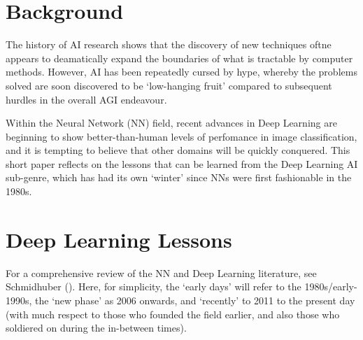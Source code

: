 \documentclass[citeauthoryear]{llncs}
\begin{document}
\section{Background}

The history of AI research shows that the discovery of new techniques 
oftne appears to deamatically expand the boundaries of what is 
tractable by computer methods.  
However, AI has been repeatedly cursed by hype, whereby the problems 
solved are soon discovered to be `low-hanging fruit' compared to subsequent 
hurdles in the overall AGI endeavour.

Within the Neural Network (NN) field, 
recent advances in Deep Learning are beginning to show better-than-human 
levels of perfomance in image classification, and 
it is tempting to believe that other domains will be quickly conquered.  
This short paper reflects on the lessons that can be learned 
from the Deep Learning AI sub-genre, which has had its own `winter' 
since NNs were first fashionable in the 1980s.  

%
%
%

\section{Deep Learning Lessons}

For a comprehensive review of the NN and Deep Learning literature, see Schmidhuber (\cite{SchmidhuberOverview}).
Here, for simplicity, the `early days' will refer to the 1980s/early-1990s,
the `new phase' as 2006 onwards, and `recently' to 2011 to the present day
(with much respect to those who founded the field earlier, and also 
those who soldiered on during the in-between times).  
 
\end{document}
